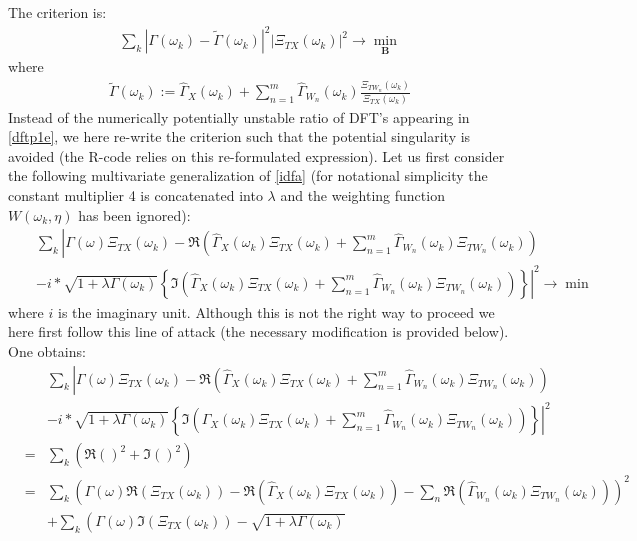 \documentclass[11pt]{article}
\begin{document}
\begin{appendix}
The criterion is:
\begin{eqnarray}
\sum_{k}\left|\Gamma(\omega_k)-\tilde{\Gamma}(\omega_k)\right|^2 \left|\Xi_{TX}(\omega_k)\right|^2\label{dtpe}\to\min_{\mathbf{B}}
\end{eqnarray}
where
\begin{eqnarray}\label{dftp1e}
\tilde{\Gamma}(\omega_k):=\hat{\Gamma}_X(\omega_k)+\sum_{n=1}^m\hat{\Gamma}_{W_n}(\omega_k)\frac{\Xi_{TW_n}(\omega_k)}{\Xi_{TX}(\omega_k)}
\end{eqnarray}
Instead of the numerically potentially unstable ratio of DFT's appearing in \ref{dftp1e}, we here re-write the criterion such that the potential singularity is avoided (the R-code relies on this re-formulated expression). Let us first consider the following multivariate generalization of \ref{idfa} (for notational simplicity the constant multiplier 4 is concatenated into $\lambda$ and the weighting function $W(\omega_k,\eta)$ has been ignored):
\begin{eqnarray*}
&&\sum_k\left|\Gamma(\omega)\Xi_{TX}(\omega_k)-\Re\left(\hat{\Gamma}_X(\omega_k)\Xi_{TX}(\omega_k)+\sum_{n=1}^m\hat{\Gamma}_{W_n}(\omega_k)\Xi_{TW_n}(\omega_k)\right)\right.\\
&&\left.-i*\sqrt{1+\lambda\Gamma(\omega_k)}\left\{\Im\left(\hat{\Gamma}_X(\omega_k)\Xi_{TX}(\omega_k)+\sum_{n=1}^m\hat{\Gamma}_{W_n}(\omega_k)\Xi_{TW_n}(\omega_k)\right)\right\}\right|^2\to\min
\end{eqnarray*}
where $i$ is the imaginary unit. Although this is not the right way to proceed we here first follow this line of attack (the necessary modification is provided below). One obtains:
\begin{eqnarray}
&&\sum_k\left|\Gamma(\omega)\Xi_{TX}(\omega_k)-\Re\left(\hat{\Gamma}_X(\omega_k)\Xi_{TX}(\omega_k)+\sum_{n=1}^m\hat{\Gamma}_{W_n}(\omega_k)\Xi_{TW_n}(\omega_k)\right)\right.\label{heretoo}\\
&&\left.-i*\sqrt{1+\lambda\Gamma(\omega_k)}\left\{\Im\left(\hat{\Gamma}_X(\omega_k)\Xi_{TX}(\omega_k)+\sum_{n=1}^m\hat{\Gamma}_{W_n}(\omega_k)\Xi_{TW_n}(\omega_k)\right)\right\}\right|^2\label{here}\\
&=&\sum_k\left(\Re()^2+\Im()^2\right)\nonumber\\
&=&\sum_k\left(\Gamma(\omega)\Re\left(\Xi_{TX}(\omega_k)\right)-\Re\left(\hat{\Gamma}_X(\omega_k)\Xi_{TX}(\omega_k)\right)-
\sum_n\Re\left(\hat{\Gamma}_{W_n}(\omega_k)\Xi_{TW_n}(\omega_k)\right)\right)^2\nonumber\\
&&+\sum_k\left(\Gamma(\omega)\Im\left(\Xi_{TX}(\omega_k)\right)-\sqrt{1+\lambda\Gamma(\omega_k)}

\end{eqnarray}
\end{appendix}
\end{document}
